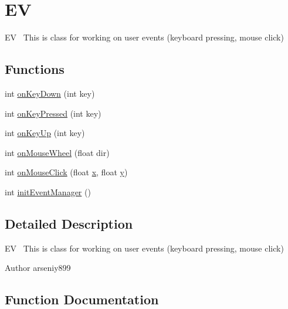 \hypertarget{group___event_manager}{}\section{EV}
\label{group___event_manager}


EV~\newline
This is \textquotesingle{}class\textquotesingle{} for working on user events (keyboard pressing, mouse click)  


\subsection*{Functions}
\begin{DoxyCompactItemize}
\item 
int \hyperlink{group___event_manager_ga3ce16bba2f2a79d18098dc5051f3ffe2}{on\+Key\+Down} (int key)
\item 
int \hyperlink{group___event_manager_gaef72f62038b36afa849c887d2b96115a}{on\+Key\+Pressed} (int key)
\item 
int \hyperlink{group___event_manager_gaeed663775ba4ef9673bddbd1927a189b}{on\+Key\+Up} (int key)
\item 
int \hyperlink{group___event_manager_ga258410971167dcb64eef4d4653a33efc}{on\+Mouse\+Wheel} (float dir)
\item 
int \hyperlink{group___event_manager_gaab01ff33aa8808c2f3e37120bb6bf881}{on\+Mouse\+Click} (float \hyperlink{fmaths_8inl_a7ba8ab2f1e8f362163e17da3f15a5db9}{x}, float \hyperlink{fmaths_8inl_ad01ab75ae50a1a624185bfa014c66cfa}{y})
\item 
int \hyperlink{group___event_manager_ga35d56a098d32ab9aa927533a2f618f08}{init\+Event\+Manager} ()
\end{DoxyCompactItemize}


\subsection{Detailed Description}
EV~\newline
This is \textquotesingle{}class\textquotesingle{} for working on user events (keyboard pressing, mouse click) 

\begin{DoxyAuthor}{Author}
arseniy899 
\end{DoxyAuthor}


\subsection{Function Documentation}
\mbox{\label{group___event_manager_ga35d56a098d32ab9aa927533a2f618f08}} 
